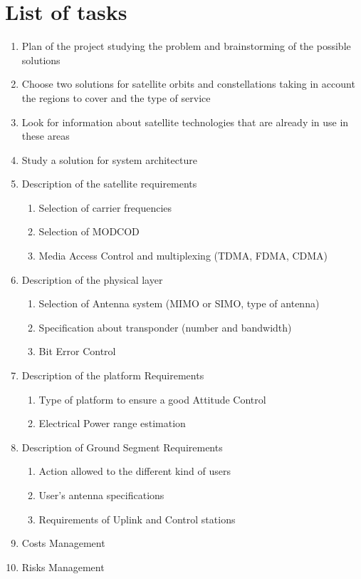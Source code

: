 \documentclass[11pt,a4paper,titlepage]{article}
\begin{document}
\section{List of tasks}{
	\begin{enumerate}
		\item Plan of the project studying the problem and brainstorming of the possible solutions
		\item Choose two solutions for satellite orbits and constellations taking in account the regions to cover and the type of service
		\item Look for information about satellite technologies that are already in use in these areas
		\item Study a solution for system architecture
		\item Description of the satellite requirements
		\begin{enumerate}
			\item Selection of carrier frequencies
			\item Selection of MODCOD
			\item Media Access Control and multiplexing (TDMA, FDMA, CDMA)
		\end{enumerate}
		\item Description of the physical layer
		\begin{enumerate}
			\item Selection of Antenna system (MIMO or SIMO, type of antenna)
			\item Specification about transponder (number and bandwidth)
			\item Bit Error Control
		\end{enumerate}
		\item Description of the platform Requirements
		\begin{enumerate}
			\item Type of platform to ensure a good Attitude Control
			\item Electrical Power range estimation
		\end{enumerate}
		\item Description of Ground Segment Requirements
		\begin{enumerate}
			\item Action allowed to the different kind of users
			\item User's antenna specifications
			\item Requirements of Uplink and Control stations
		\end{enumerate}
		\item Costs Management
		\item Risks Management
	\end{enumerate}
}\label{sec:tasks}
\end{document}
